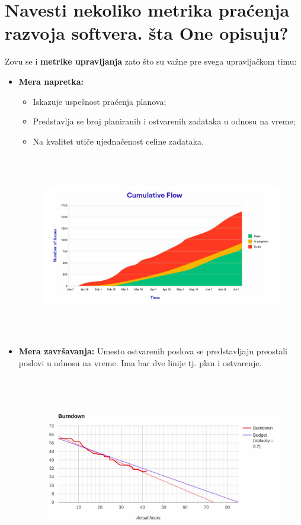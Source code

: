 \documentclass[a4paper]{article}
\begin{document}
\section{Navesti nekoliko metrika praćenja razvoja softvera. šta One opisuju?}
  Zovu se i \textbf{metrike upravljanja} zato što su važne pre svega upravljačkom timu:
  \begin{itemize}
    \item \textbf{Mera napretka:}
      \begin{itemize}
        \item Iskazuje uspešnost praćenja planova;
        \item Predstavlja se broj planiranih i ostvarenih zadataka u odnosu na vreme;
        \item Na kvalitet utiče ujednačenost celine zadataka.
      \end{itemize}
    \begin{figure}[H]
      \begin{center}
          \includegraphics[width=120mm,height=80mm]{Slike/mera_napretka.png}
      \end{center}
    \end{figure}
    \item \textbf{Mera završavanja:} Umesto ostvarenih poslova se predstavljaju preostali poslovi
          u odnosu na vreme. Ima bar dve linije tj. plan i ostvarenje.
    \begin{figure}[H]
      \begin{center}
          \includegraphics[width=120mm,height=80mm]{Slike/mera_dovrsavanja.png}

\end{center}
\end{figure}
\end{itemize}
\end{document}
